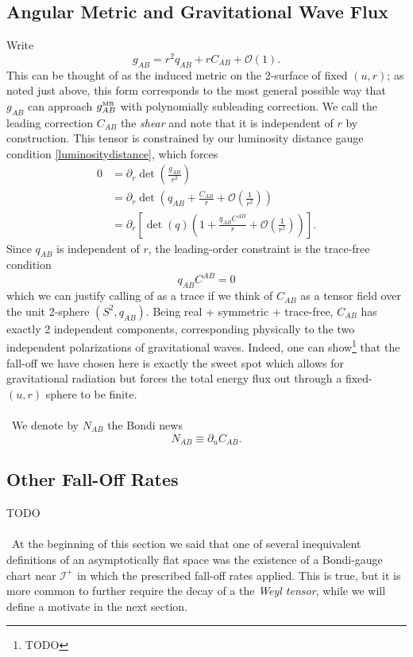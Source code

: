 \documentclass[11pt,letterpaper]{article}
\newcommand{\LP}{\left(}
\newcommand{\RP}{\right)}
\newcommand{\mc}[1]{\mathcal{#1}}
\newcommand{\D}{\partial}
\begin{document}
\subsection{Angular Metric and Gravitational Wave Flux}
Write \begin{equation}
g_{AB} = r^2 q_{AB} + r C_{AB} + \mc{O}(1).
\end{equation}
This can be thought of as the induced metric on the 2-surface of fixed $(u,r)$; as noted just above, this form corresponds to the most general possible way that $g_{AB}$ can approach $g_{AB}^{\mbox{\tiny{MB}}}$ with polynomially subleading correction. We call the leading correction $C_{AB}$ the \textit{shear} and note that it is independent of $r$ by construction. This tensor is constrained by our luminosity distance gauge condition \eqref{luminositydistance}, which forces \begin{equation}
\begin{aligned}
0 & = \D_r \det \LP \frac{g_{AB}}{r^2} \RP \\
& = \D_r \det \LP q_{AB} + \frac{C_{AB}}{r} + \mc{O}\LP \frac{1}{r^2} \RP \RP \\
& = \D_r \left[ \det(q) \LP 1 + \frac{q_{AB} C^{AB}}{r} + \mc{O} \LP \frac{1}{r^2} \RP \RP \right].
\end{aligned}
\end{equation}
Since $q_{AB}$ is independent of $r$, the leading-order constraint is the trace-free condition \begin{equation}
q_{AB} C^{AB} = 0
\end{equation}
which we can justify calling of as a trace if we think of $C_{AB}$ as a tensor field over the unit 2-sphere $(S^2, q_{AB})$. Being real + symmetric + trace-free, $C_{AB}$ has exactly 2 independent components, corresponding physically to the two independent polarizations of gravitational waves. Indeed, one can show\footnote{TODO} that the fall-off we have chosen here is exactly the sweet spot which allows for gravitational radiation but forces the total energy flux out through a fixed-$(u,r)$ sphere to be finite. \\
\\
\
We denote by $N_{AB}$ the Bondi news \begin{equation}
N_{AB} \equiv \D_u C_{AB}.
\end{equation}


\subsection{Other Fall-Off Rates}
TODO\\
\\
\
At the beginning of this section we said that one of several inequivalent definitions of an asymptotically flat space was the existence of a Bondi-gauge chart near $\mathcal{I}^+$ in which the prescribed fall-off rates applied. This is true, but it is more common to further require the decay of a the \textit{Weyl tensor}, while we will define a motivate in the next section.
\end{document}

